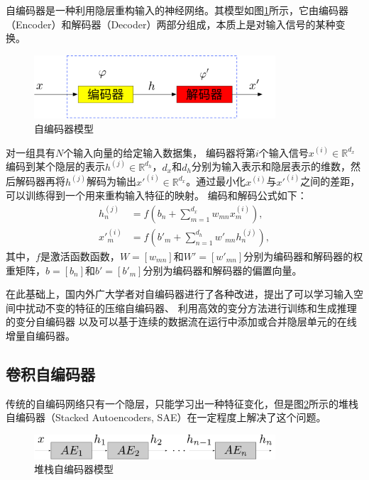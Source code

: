 自编码器是一种利用隐层重构输入的神经网络。其模型如图\ref{fig:ae}所示，它由编码器（Encoder）和解码器（Decoder）两部分组成，本质上是对输入信号的某种变换。
\begin{figure}[hbt]
	\centering
	\includegraphics[width=9cm]{figures/AE/ae}
	\caption{自编码器模型}
	\label{fig:ae}
\end{figure}
对一组具有$N$个输入向量的给定输入数据集，
编码器将第$i$个输入信号$x^{(i)}\in\mathbb{R}^{d_x}$编码到某个隐层的表示$h^{(j)}\in\mathbb{R}^{d_h}$，$d_x$和$d_h$分别为输入表示和隐层表示的维数，然后解码器再将$h^{(j)}$解码为输出$x'^{(i)}\in\mathbb{R}^{d_x}$。通过最小化$x^{(i)}$与$x'^{(i)}$之间的差距，可以训练得到一个用来重构输入特征的映射。
编码和解码公式如下：
\begin{align}
	h^{(j)}_n &= f(b_n+\sum_{m=1}^{d_x}w_{mn}x^{(i)}_m), \\
	x'^{(i)}_m &= f(b'_m+\sum_{n=1}^{d_h}w'_{mn}h^{(j)}_n),
\end{align}
其中，$f$是激活函数函数，${W}=[w_{mn}]$和${W}'=[w'_{mn}]$分别为编码器和解码器的权重矩阵，${b}=[b_n]$和${b'}=[b'_m]$分别为编码器和解码器的偏置向量。

在此基础上，国内外广大学者对自编码器进行了各种改进，提出了可以学习输入空间中扰动不变的特征的压缩自编码器、
利用高效的变分方法进行训练和生成推理的变分自编码器
以及可以基于连续的数据流在运行中添加或合并隐层单元的在线增量自编码器。

\subsection{卷积自编码器}
传统的自编码网络只有一个隐层，只能学习出一种特征变化，但是图\ref{fig:sae}所示的堆栈自编码器（Stacked Autoencoders, SAE）在一定程度上解决了这个问题。
\begin{figure}[hbt]
	\centering
	\includegraphics[width=9cm]{figures/AE/sae}
	\caption{堆栈自编码器模型}
	\label{fig:sae}
\end{figure}

